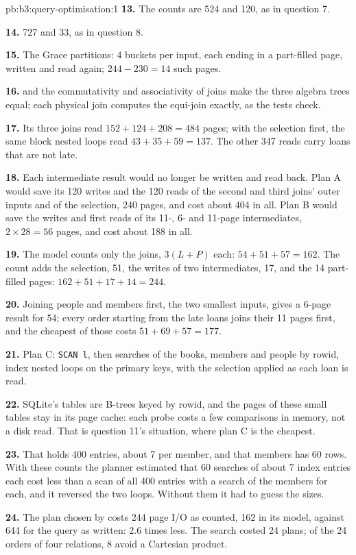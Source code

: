 \begin{solution}{pb:b3:query-optimisation:1}
\textbf{13.} The counts are 524 and 120, as in question 7.

\textbf{14.} 727 and 33, as in question 8.

\textbf{15.} The Grace partitions: 4 buckets per input, each ending in a part-filled page, written and read again; $244 - 230 = 14$ such pages.

\textbf{16.}  and the commutativity and associativity of joins make the three algebra trees equal; each physical join computes the equi-join exactly, as the tests check.

\textbf{17.} Its three joins read $152 + 124 + 208 = 484$ pages; with the selection first, the same block nested loops read $43 + 35 + 59 = 137$. The other 347 reads carry loans that are not late.

\textbf{18.} Each intermediate result would no longer be written and read back. Plan A would save its 120 writes and the 120 reads of the second and third joins' outer inputs and of the selection, 240 pages, and cost about 404 in all. Plan B would save the writes and first reads of its 11-, 6- and 11-page intermediates, $2 \times 28 = 56$ pages, and cost about 188 in all.

\textbf{19.} The model counts only the joins, $3(L + P)$ each: $54 + 51 + 57 = 162$. The count adds the selection, 51, the writes of two intermediates, 17, and the 14 part-filled pages: $162 + 51 + 17 + 14 = 244$.

\textbf{20.} Joining people and members first, the two smallest inputs, gives a 6-page result for 54; every order starting from the late loans joins their 11 pages first, and the cheapest of those costs $51 + 69 + 57 = 177$.

\textbf{21.} Plan C: \texttt{SCAN l}, then searches of the books, members and people by rowid, index nested loops on the primary keys, with the selection applied as each loan is read.

\textbf{22.} SQLite's tables are B-trees keyed by rowid, and the pages of these small tables stay in its page cache: each probe costs a few comparisons in memory, not a disk read. That is question 11's situation, where plan C is the cheapest.

\textbf{23.} That  holds 400 entries, about 7 per member, and that members has 60 rows. With these counts the planner estimated that 60 searches of about 7 index entries each cost less than a scan of all 400 entries with a search of the members for each, and it reversed the two loops. Without them it had to guess the sizes.

\textbf{24.} The plan chosen by  costs 244 page I/O as counted, 162 in its model, against 644 for the query as written: 2.6 times less. The search costed 24 plans; of the 24 orders of four relations, 8 avoid a Cartesian product.
\end{solution}
